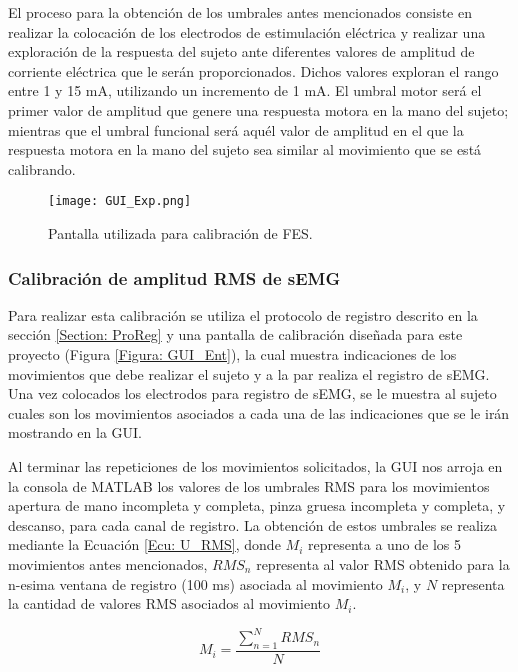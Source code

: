 El proceso para la obtención de los umbrales antes mencionados consiste en realizar la colocación de los electrodos de estimulación eléctrica y realizar una exploración de la respuesta del sujeto ante diferentes valores de amplitud de corriente eléctrica que le serán proporcionados. Dichos valores exploran el rango entre 1 y 15 mA, utilizando un incremento de 1 mA. El umbral motor será el primer valor de amplitud que genere una respuesta motora en la mano del sujeto; mientras que el umbral funcional será aquél valor de amplitud en el que la respuesta motora en la mano del sujeto sea similar al movimiento que se está calibrando.

\begin{figure}[htb]
	\centering
	\texttt{[image: GUI\_Exp.png]}
	\caption{Pantalla utilizada para calibración de FES.}
	\label{Figura: GUI_Exp}
\end{figure}

\subsubsection{Calibración de amplitud RMS de sEMG}
Para realizar esta calibración se utiliza el protocolo de registro descrito en la sección \ref{Section: ProReg} y una pantalla de calibración diseñada para este proyecto (Figura \ref{Figura: GUI_Ent}), la cual muestra indicaciones de los movimientos que debe realizar el sujeto y a la par realiza el registro de sEMG. Una vez colocados los electrodos para registro de sEMG, se le muestra al sujeto cuales son los movimientos asociados a cada una de las indicaciones que se le irán mostrando en la GUI.%

Al terminar las repeticiones de los movimientos solicitados, la GUI nos arroja en la consola de MATLAB los valores de los umbrales RMS para los movimientos apertura de mano incompleta y completa, pinza gruesa incompleta y completa, y descanso, para cada canal de registro. La obtención de estos umbrales se realiza mediante la Ecuación \ref{Ecu: U_RMS}, donde $M_i$ representa a uno de los 5 movimientos antes mencionados, $RMS_n$ representa al valor RMS obtenido para la n-esima ventana de registro (100 ms) asociada al movimiento $M_i$, y $N$ representa la cantidad de valores RMS asociados al movimiento $M_i$.

\begin{equation}
	M_i = \frac{\sum_{n=1}^{N}RMS_{n}}{N}
	\label{Ecu: U_RMS}
\end{equation}

